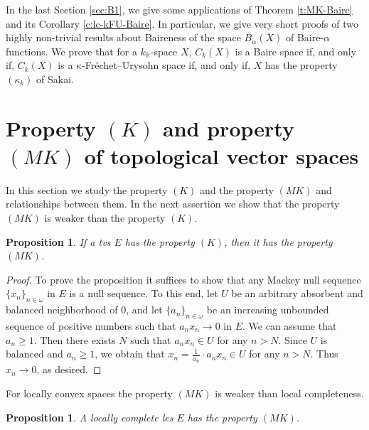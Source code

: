 \documentclass[preprint,11pt]{elsarticle}
\newtheorem{proposition}[theorem]{Proposition}
\theoremstyle{definition}
\theoremstyle{remark}
\numberwithin{equation}{section}
\numberwithin{theorem}{section}
\newcommand{\w}{\omega}
\newcommand{\IR}{\mathbb{R}}
\newcommand{\CC}{C_k}
\begin{document}
In the last Section \ref{sec:B1}, we give some applications of Theorem \ref{t:MK-Baire} and its Corollary \ref{c:lc-kFU-Baire}. In particular, we give  very short proofs of two highly non-trivial results about Baireness of the space $B_\alpha(X)$ of Baire-$\alpha$ functions.
We  prove that for a $k_\IR$-space $X$, $\CC(X)$ is a Baire space if, and only if, $\CC(X)$ is a $\kappa$-Fr\'{e}chet--Urysohn space
if, and only if, $X$ has the property $(\kappa_k)$ of Sakai.



\section{Property $(K)$ and property $(MK)$ of topological vector spaces  } \label{sec:K-MK}



In this section we study the property $(K)$ and the property $(MK)$ and relationships between them. In the next assertion we show that the property $(MK)$ is weaker than the property $(K)$.

\begin{proposition} \label{p:K=>MK}
If a tvs $E$ has the property $(K)$, then it has the property $(MK)$.
\end{proposition}

\begin{proof}
To prove the proposition it suffices to show that any Mackey null sequence $\{x_n\}_{n\in\w}$ in $E$ is a null sequence. To this end, let $U$ be an arbitrary absorbent and balanced neighborhood of $0$, and let $\{a_n\}_{n\in\w}$ be an increasing unbounded sequence of positive numbers such that $a_n x_n \to 0$ in $E$. We can assume that $a_n\geq 1$. Then there exists $N$ such that $a_n x_n\in U$ for any $n>N$. Since $U$ is balanced and
$a_n\geq 1$, we obtain that $x_n=\tfrac{1}{a_n}\cdot a_nx_n\in U$ for any $n>N$. Thus $x_n\to 0$, as desired.
\end{proof}


For locally convex spaces the property $(MK)$ is weaker than local completeness.

\begin{proposition} \label{p:lc-k-complete}
A locally complete lcs $E$ has the property $(MK)$.
\end{proposition}
\end{document}
